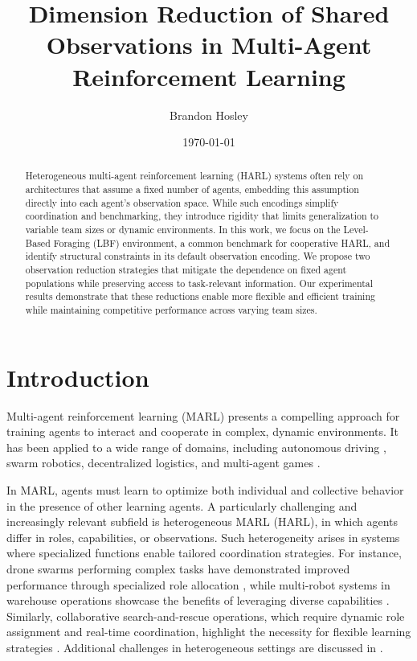 \documentclass{article}
\title{Dimension Reduction of Shared Observations in Multi-Agent Reinforcement Learning}
\author{Brandon Hosley}
\date{\today}
\begin{document}
\maketitle

\begin{abstract}
Heterogeneous multi-agent reinforcement learning (HARL) systems 
often rely on architectures that assume a fixed number of agents, 
embedding this assumption directly into each agent's observation space. 
While such encodings simplify coordination and benchmarking, 
they introduce rigidity that limits generalization to variable team 
sizes or dynamic environments. 
In this work, we focus on the Level-Based Foraging (LBF) environment, 
a common benchmark for cooperative HARL, 
and identify structural constraints in its default observation encoding. 
We propose two observation reduction strategies that mitigate the dependence 
on fixed agent populations while preserving access to task-relevant information. 
Our experimental results demonstrate that these reductions enable more 
flexible and efficient training while maintaining competitive 
performance across varying team sizes.
\end{abstract}

\section{Introduction}

Multi-agent reinforcement learning (MARL) presents a compelling approach for training agents to 
interact and cooperate in complex, dynamic environments. It has been applied to a wide range of 
domains, including autonomous driving \cite{yang2021a}, swarm robotics, \cite{brambilla2013} 
decentralized logistics, and multi-agent games \cite{vinyals2019,berner2019}.
 
In MARL, agents must learn to optimize both individual and collective behavior in the presence 
of other learning agents. A particularly challenging and increasingly relevant subfield is 
heterogeneous MARL (HARL), in which agents differ in roles, capabilities, or observations. Such 
heterogeneity arises in systems where specialized functions enable tailored coordination 
strategies. For instance, drone swarms performing complex tasks have demonstrated improved 
performance through specialized role allocation \cite{huttenrauch2019}, while multi-robot 
systems in warehouse operations showcase the benefits of leveraging diverse capabilities 
\cite{rizk2019}. Similarly, collaborative search-and-rescue operations, which require dynamic 
role assignment and real-time coordination, highlight the necessity for flexible learning 
strategies \cite{hoang2023}. Additional challenges in heterogeneous settings are discussed in 
\cite{kapetanakis2005,hernandez-leal2019}.
\end{document}
